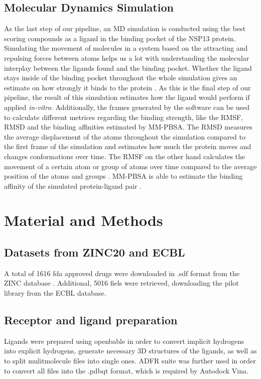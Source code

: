 \documentclass[11pt, letterpaper, titlepage]{article}
\renewcommand{\cite}{\parencite}
\begin{document}
\subsection{Molecular Dynamics Simulation}
As the last step of our pipeline, an \ac{MD} simulation is conducted using the best scoring compounds as a ligand in the binding pocket of the NSP13 protein. Simulating the movement of molecules in a system based on the attracting and repulsing forces between atoms helps us a lot with understanding the molecular interplay between the ligands found and the binding pocket. Whether the ligand stays inside of the binding pocket throughout the whole simulation gives an estimate on how strongly it binds to the protein \cite{MD_Basics}. As this is the final step of our pipeline, the result of this simulation estimates how the ligand would perform if applied \textit{in-vitro}. Additionally, the frames generated by the software can be used to calculate different metrices regarding the binding strength, like the \ac{RMSF}, \ac{RMSD} and the binding affinities estimated by \ac{MM-PBSA}. The \ac{RMSD} measures the average displacement of the atoms throughout the simulation compared to the first frame of the simulation and estimates how much the protein moves and changes conformations over time. The \ac{RMSF} on the other hand calculates the movement of a certain atom or group of atoms over time compared to the average position of the atoms and groups \cite{RMSD_RMSF}. \ac{MM-PBSA} is able to estimate the binding affinity of the simulated protein-ligand pair \cite{MM_PBSA}.


\section{Material and Methods}
\subsection{Datasets from ZINC20 and ECBL}
A total of 1616 fda approved drugs were downloaded in .sdf format from the ZINC database \cite{Irwin.2020}. Additional, 5016 fiels were retrieved, downloading the pilot library from the ECBL database.

\subsection{Receptor and ligand preparation}
Ligands were prepared using openbable in order to convert implicit hydrogens into explicit hydrogens, generate necessary 3D structures of the ligands, as well as to split mulitmolecule files into single ones. ADFR suite was further used in order to convert all files into the .pdbqt format, which is required by Autodock Vina. 
 
\end{document}
